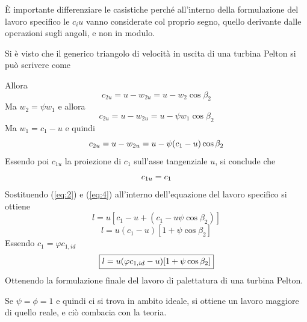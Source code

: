 \documentclass[a4paper, 15pt]{article}
\begin{document}
\begin{adjustwidth}{2in}{}
	È importante differenziare le casistiche perché all'interno della formulazione del lavoro specifico le $c_iu$ vanno considerate col proprio segno, quello derivante dalle operazioni sugli angoli, e non in modulo. \newline 
	
	Si è visto che il generico triangolo di velocità in uscita di una turbina Pelton si può scrivere come
	

	Allora 
	\[c_{2u} = u - w_{2u} = u - w_2\cos\beta_2\]
	Ma $w_2 = \psi w_1$ e allora
	\[c_{2u} = u - w_{2u} = u - \psi w_1\cos\beta_2\]
	Ma $w_1 = c_1-u$ e quindi
	\begin{equation}{\label{eq:2}}
		c_{2u} = u - w_{2u} = u - \psi(c_1-u)\cos\beta_2
	\end{equation}
	Essendo poi $c_{1u}$ la proiezione di $c_1$ sull'asse tangenziale $u$, si conclude che 
	\begin{equation}{\label{eq:4}}
		c_{1u}=c_1
	\end{equation}
	Sostituendo (\ref{eq:2}) e (\ref{eq:4}) all'interno dell'equazione del lavoro specifico si ottiene 
	\[l = u\left[c_1-u+(c_1-u\psi\cos\beta_2)\right]\]
	\[l = u(c_1-u)[1+\psi\cos\beta_2]\]
	Essendo $c_1 = \varphi c_{1,id}$ 
	\begin{equation}{\label{eq:5}}
		\boxed{l = u(\varphi c_{1,id}-u)[1+\psi\cos\beta_2]}
	\end{equation}
	Ottenendo la formulazione finale del lavoro di palettatura di una turbina Pelton. \newline 
	
	Se $\psi = \phi = 1$ e quindi ci si trova in ambito ideale, si ottiene un lavoro maggiore di quello reale, e ciò combacia con la teoria.  	
\end{adjustwidth}
\end{document}
